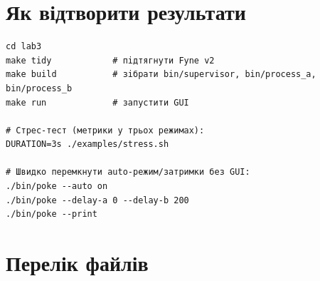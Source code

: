 \documentclass[a4paper,12pt]{article}
\begin{document}
\section{Як відтворити результати}

\begin{lstlisting}[basicstyle=\ttfamily\footnotesize]
cd lab3
make tidy            # пiдтягнути Fyne v2
make build           # зiбрати bin/supervisor, bin/process_a, bin/process_b
make run             # запустити GUI

# Стрес-тест (метрики у трьох режимах):
DURATION=3s ./examples/stress.sh

# Швидко перемкнути auto-режим/затримки без GUI:
./bin/poke --auto on
./bin/poke --delay-a 0 --delay-b 200
./bin/poke --print
\end{lstlisting}

\section{Перелік файлів}
\end{document}
